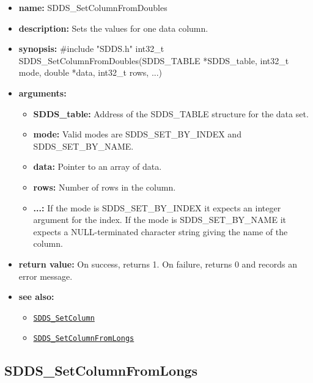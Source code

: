 \documentclass[11pt]{article}
\newcommand{\progref}[1]{\hyperref[SDDS_#1]{\tt SDDS\_#1}}
\begin{document}
\begin{itemize}
\item {\bf name:}\newline
SDDS\_SetColumnFromDoubles
\item {\bf description:}\newline
Sets the values for one data column.
\item {\bf synopsis:} \#include "SDDS.h"\newline
int32\_t SDDS\_SetColumnFromDoubles(SDDS\_TABLE *SDDS\_table, int32\_t mode, double *data, int32\_t rows, ...)
\item {\bf arguments:}
\begin{itemize}
\item {\bf SDDS\_table:} Address of the SDDS\_TABLE structure for the data set.
\item {\bf mode:} Valid modes are SDDS\_SET\_BY\_INDEX and SDDS\_SET\_BY\_NAME.
\item {\bf data:} Pointer to an array of data.
\item {\bf rows:} Number of rows in the column.
\item {\bf ...:} If the mode is SDDS\_SET\_BY\_INDEX it expects an integer argument for the index. If the mode is SDDS\_SET\_BY\_NAME it expects a NULL-terminated character string giving the name of the column.
\end{itemize}
\item {\bf return value:}\newline
On success, returns 1. On failure, returns 0 and records an error message.
\item {\bf see also:}
\begin{itemize}
\item \progref{SetColumn}
\item \progref{SetColumnFromLongs}
\end{itemize}
\end{itemize}

\subsection{SDDS\_SetColumnFromLongs}
\label{SDDS_SetColumnFromLongs}
\end{document}
